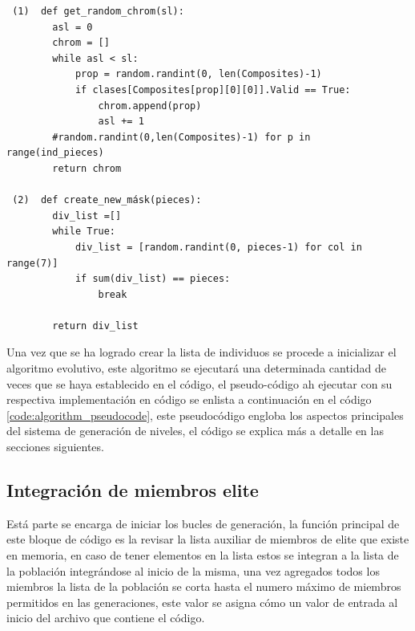 \begin{listing}[ht]
  \begin{verbatim}
 (1)  def get_random_chrom(sl):
        asl = 0
        chrom = []
        while asl < sl:
            prop = random.randint(0, len(Composites)-1)
            if clases[Composites[prop][0][0]].Valid == True:
                chrom.append(prop)
                asl += 1
        #random.randint(0,len(Composites)-1) for p in range(ind_pieces)
        return chrom

 (2)  def create_new_másk(pieces):
        div_list =[]
        while True:
            div_list = [random.randint(0, pieces-1) for col in range(7)]
            if sum(div_list) == pieces:
                break
          
        return div_list
  \end{verbatim}
  \caption{Código de asignación de cromosomas(piezas)[1] y código para generar máscaras [2]}
  \label{code:get_random_chrom}
\end{listing}

Una vez que se ha logrado crear la lista de individuos se procede a inicializar
el algoritmo evolutivo, este algoritmo se ejecutará una determinada cantidad de
veces que se haya establecido en el código, el pseudo-código ah ejecutar con su
respectiva implementación en código se enlista a continuación en el código
\ref{code:algorithm_pseudocode}, este pseudocódigo engloba los aspectos
principales del sistema de generación de niveles, el código se explica más a
detalle en las secciones siguientes.

\begin{listing}[ht]
  \scalebox{.8}{}
  \caption{Pseudo-código del algoritmo genético}
  \label{code:algorithm_pseudocode}
\end{listing}

\subsection{Integración de miembros elite}
\label{subsection:elite_member_integration}

Está parte se encarga de iniciar los bucles de generación, la función principal
de este bloque de código es la revisar la lista auxiliar de miembros de elite
que existe en memoria, en caso de tener elementos en la lista estos se integran
a la lista de la población integrándose al inicio de la misma, una vez agregados
todos los miembros la lista de la población se corta hasta el numero máximo de
miembros permitidos en las generaciones, este valor se asigna cómo un valor de
entrada al inicio del archivo que contiene el código.


